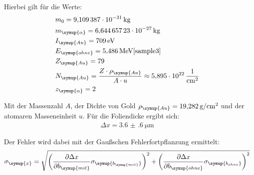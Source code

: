 Hierbei gilt für die Werte:
\begin{align*}
  &m_0 = \SI{9.109387e-31}{\kilo\gram} \\
  &m_{\symup{\alpha}} = \SI{6.64465723e-27}{\kilo\gram} \\
  &I_{\symup{Au}} = \SI{709}{\eV} \\
  &E_{\symup{ohne}} = \SI{5.486}{\mega\eV}   \text{\cite{sample3}} \\
  &Z_{\symup{Au}} = 79 \\
  &N_{\symup{Au}} = \frac{Z \cdot \rho_{\symup{Au}}}{A \cdot u} \approx \SI{5.895e22}{\per\centi\meter\squared} \\
  &z_{\symup{\alpha}} = 2 \\
\end{align*}

Mit der Massenzahl $A$, der Dichte von Gold $\rho_{\symup{Au}}= \SI{19.282}{\gram\per\centi\meter\squared}$ und der atomaren Masseneinheit $u$.
Für die Foliendicke ergibt sich:
\begin{align*}
  \Delta x = \SI{3.6(6)}{\micro\meter}
\end{align*}

Der Fehler wird dabei mit der Gaußschen Fehlerfortpflanzung ermittelt:
\begin{align*}
  \sigma_{\symup{x}} = \sqrt{\left(\frac{\partial \Delta x}{\partial b_{\symup{mit}}}\sigma_{\symup{b_{\symup{mit}}}}\right)^2 + \left(\frac{\partial \Delta x}{\partial b_{\symup{ohne}}}\sigma_{\symup{b_{ohne}}}\right)^2}
\end{align*}

